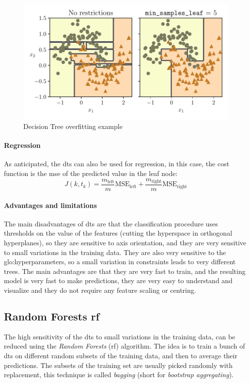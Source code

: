 \begin{figure}
    \centering
    \includegraphics{images/MachineLearning/DecisionTreeOverfitting.pdf}
    \caption{Decision Tree overfitting example }
    \label{fig:DecisionTreeOverfitting}
\end{figure}

\paragraph{Regression}
As anticipated, the \gls{dt}s can also be used for regression, in this case, the cost function is the \gls{mse} of the predicted value in the leaf node:
\begin{equation}
    J(k, t_k) = \frac{m_{\text{left}}}{m}\text{MSE}_{\text{left}} + \frac{m_{\text{right}}}{m}\text{MSE}_{\text{right}}
\end{equation}

\paragraph{Advantages and limitations}
The main disadvantages of \gls{dt}s are that the classification procedure uses thresholds on the value of the features (cutting the hyperspace in orthogonal hyperplanes), so they are sensitive to axis orientation, and they are very sensitive to small variations in the training data. They are also very sensitive to the \gls{glo:hyperparameter}s, so a small variation in constraints leads to very different trees. The main advantages are that they are very fast to train, and the resulting model is very fast to make predictions, they are very easy to understand and visualize and they do not require any feature scaling or centring.

\subsection{Random Forests \gls{rf}}
\label{subsec:rf}
The high sensitivity of the \gls{dt}s to small variations in the training data, can be reduced using the \emph{Random Forests} (\gls{rf}) algorithm. The idea is to train a bunch of \gls{dt}s on different random subsets of the training data, and then to average their predictions. The subsets of the training set are usually picked randomly with replacement, this technique is called \emph{bagging} (short for \emph{bootstrap aggregating}). 

